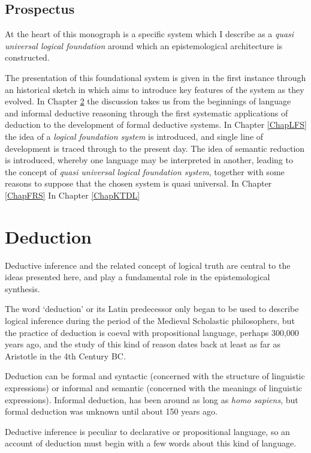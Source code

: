 \documentclass[10pt,titlepage]{book}
\begin{document}
\section{Prospectus}

At the heart of this monograph is a specific system which I describe as a \emph{quasi universal logical foundation} around which an epistemological architecture is constructed.

The presentation of this foundational system is given in the first instance through an historical sketch in which aims to introduce key features of the system as they evolved.
In Chapter \ref{ChapDeduction} the discussion takes us from the beginnings of language and informal deductive reasoning through the first systematic applications of deduction to the development of formal deductive systems.
In Chapter \ref{ChapLFS} the idea of a \emph{logical foundation system} is introduced, and single line of development is traced through to the present day.
The idea of semantic reduction is introduced, whereby one language may be interpreted in another, leading to the concept of \emph{quasi universal logical foundation system}, together with some reasons to suppose that the chosen system is quasi universal.
In Chapter \ref{ChapFRS}
In Chapter \ref{ChapKTDL}



\chapter{Deduction}\label{ChapDeduction}

Deductive inference and the related concept of logical truth are central to the ideas presented here, and play a fundamental role in the epistemological synthesis.

The word `deduction' or its Latin predecessor only began to be used to describe logical inference during the period of the Medieval Scholastic philosophers, but the practice of deduction is coeval with propositional language, perhaps 300,000 years ago, and the study of this kind of reason dates back at least as far as Aristotle in the 4th Century BC.

Deduction can be formal and syntactic (concerned with the structure of linguistic expressions)  or informal and semantic (concerned with the meanings of linguistic expressions).
Informal deduction, has been around as long as \emph{homo sapiens}, but formal deduction was unknown until about 150 years ago.

Deductive inference is peculiar to declarative or propositional language, so an account of deduction must begin with a few words about this kind of language.
\end{document}
